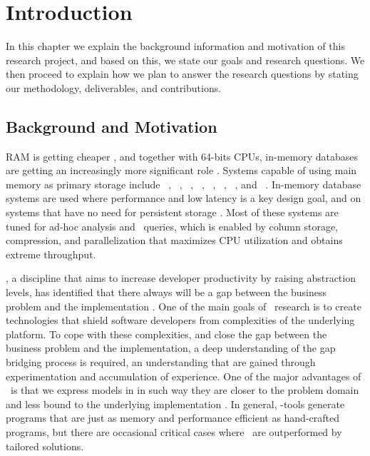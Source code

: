 \chapter{Introduction}
\label{chap:introduction}
In this chapter we explain the background information and motivation of this research project, and based on this, we state our goals and research questions. We then proceed to explain how we plan to answer the research questions by stating our methodology, deliverables, and contributions.
\clearpage

\section{Background and Motivation}
\label{sec:Background and Motivation}
RAM is getting cheaper \cite{Exasol2014-xh}, and together with 64-bits CPUs, in-memory databases are getting an increasingly more significant role \cite{Delaney2014-ip}. Systems capable of using main memory as primary storage include \oracle~\cite{Lahiri2015-mz}, \saph~\cite{Farber2012-vh}, \gorilla~\cite{Pelkonen2015-ko}, \qlikview~\cite{Qlik2011-ef}, \tableau~\cite{Kamkolkar2015-iq}, \monetdb~\cite{Boncz2002-yj}, \blink~\cite{Barber2012-xt}, and \sapnw~\cite{Lemke2010-is}. In-memory database systems are used where performance and low latency is a key design goal, and on systems that have no need for persistent storage \cite{Zicari2012-is}. Most of these systems are tuned for ad-hoc analysis and \bi~queries, which is enabled by column storage, compression, and parallelization that maximizes CPU utilization and obtains extreme throughput.

\mde, a discipline that aims to increase developer productivity by raising abstraction levels, has identified that there always will be a gap between the business problem and the implementation \cite{France2007-ae}. One of the main goals of \mdd~research is to create technologies that shield software developers from complexities of the underlying platform. To cope with these complexities, and close the gap between the business problem and the implementation, a deep understanding of the gap bridging process is required, an understanding that are gained through experimentation and accumulation of experience. One of the major advantages of \mde~is that we express models in in such way they are closer to the problem domain and less bound to the underlying implementation \cite{Selic2003-qa}. In general, \mdd-tools generate programs that are just as memory and performance efficient as hand-crafted programs, but there are occasional critical cases where \mde~are outperformed by tailored solutions.

